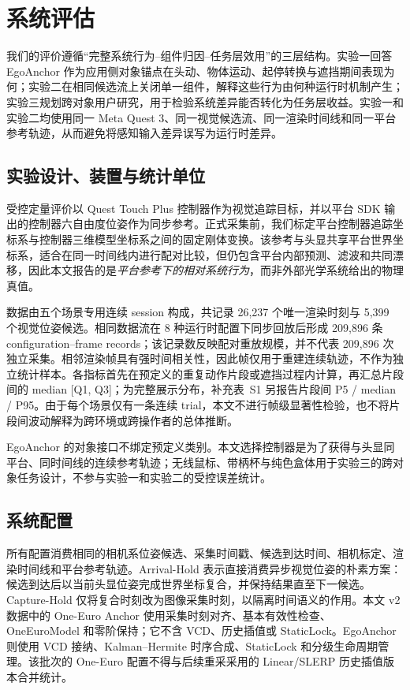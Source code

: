\documentclass[review]{vgtc}
\begin{document}
\section{系统评估}\label{sec:eval}

我们的评价遵循“完整系统行为--组件归因--任务层效用”的三层结构。实验一回答 EgoAnchor 作为应用侧对象锚点在头动、物体运动、起停转换与遮挡期间表现为何；实验二在相同候选流上关闭单一组件，解释这些行为由何种运行时机制产生；实验三规划跨对象用户研究，用于检验系统差异能否转化为任务层收益。实验一和实验二均使用同一 Meta Quest 3、同一视觉候选流、同一渲染时间线和同一平台参考轨迹，从而避免将感知输入差异误写为运行时差异。

\subsection{实验设计、装置与统计单位}

受控定量评价以 Quest Touch Plus 控制器作为视觉追踪目标，并以平台 SDK 输出的控制器六自由度位姿作为同步参考。正式采集前，我们标定平台控制器追踪坐标系与控制器三维模型坐标系之间的固定刚体变换。该参考与头显共享平台世界坐标系，适合在同一时间线内进行配对比较，但仍包含平台内部预测、滤波和共同漂移，因此本文报告的是\emph{平台参考下的相对系统行为}，而非外部光学系统给出的物理真值。

数据由五个场景专用连续 session 构成，共记录 26,237 个唯一渲染时刻与 5,399 个视觉位姿候选。相同数据流在 8 种运行时配置下同步回放后形成 209,896 条 configuration--frame records；该记录数反映配对重放规模，并不代表 209,896 次独立采集。相邻渲染帧具有强时间相关性，因此帧仅用于重建连续轨迹，不作为独立统计样本。各指标首先在预定义的重复动作片段或遮挡过程内计算，再汇总片段间的 median [Q1, Q3]；为完整展示分布，补充表~S1 另报告片段间 P5 / median / P95。由于每个场景仅有一条连续 trial，本文不进行帧级显著性检验，也不将片段间波动解释为跨环境或跨操作者的总体推断。

EgoAnchor 的对象接口不绑定预定义类别。本文选择控制器是为了获得与头显同平台、同时间线的连续参考轨迹；无线鼠标、带柄杯与纯色盒体用于实验三的跨对象任务设计，不参与实验一和实验二的受控误差统计。

\subsection{系统配置}

所有配置消费相同的相机系位姿候选、采集时间戳、候选到达时间、相机标定、渲染时间线和平台参考轨迹。Arrival-Hold 表示直接消费异步视觉位姿的朴素方案：候选到达后以当前头显位姿完成世界坐标复合，并保持结果直至下一候选。Capture-Hold 仅将复合时刻改为图像采集时刻，以隔离时间语义的作用。本文 v2 数据中的 One-Euro Anchor 使用采集时刻对齐、基本有效性检查、OneEuroModel 和零阶保持；它不含 VCD、历史插值或 StaticLock。EgoAnchor 则使用 VCD 接纳、Kalman--Hermite 时序合成、StaticLock 和分级生命周期管理。该批次的 One-Euro 配置不得与后续重采采用的 Linear/SLERP 历史插值版本合并统计。
\end{document}
